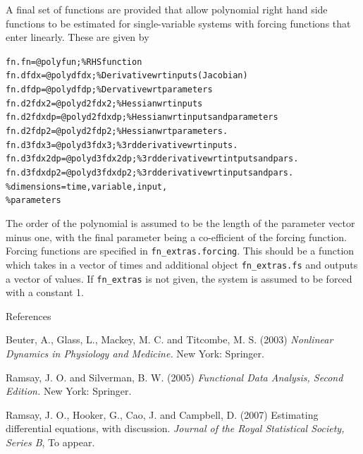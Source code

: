 \documentclass{article}
\begin{document}
A final set of functions are provided that allow polynomial right hand side functions to be
estimated for single-variable systems with forcing functions that enter linearly. These are given
by

\begin{alltt}
   fn.fn       = @polyfun;       \% RHS function
   fn.dfdx     = @polydfdx;      \% Derivative wrt inputs (Jacobian)
   fn.dfdp     = @polydfdp;      \% Dervative wrt parameters
   fn.d2fdx2   = @polyd2fdx2;    \% Hessian wrt inputs
   fn.d2fdxdp  = @polyd2fdxdp;   \% Hessian wrt inputs and parameters
   fn.d2fdp2   = @polyd2fdp2;    \% Hessian wrt parameters.
   fn.d3fdx3   = @polyd3fdx3;    \% 3rd derivative wrt inputs.
   fn.d3fdx2dp = @polyd3fdx2dp;  \% 3rd derivative wrt intputs and pars.
   fn.d3fdxdp2 = @polyd3fdxdp2;  \% 3rd derivative wrt inputs and pars.
                                 \% dimensions = time, variable, input,
                                 \% parameters
\end{alltt}

The order of the polynomial is assumed to be the length of
the parameter vector minus one, with the final parameter
being a co-efficient of the forcing function. Forcing
functions are specified in {\tt fn\_extras.forcing}. This
should be a function which takes in a vector of times and
additional object {\tt fn\_extras.fs} and outputs a
vector of values. If {\tt fn\_extras} is not given, the
system is assumed to be forced with a constant 1.

\newpage

\begin{center}
{\Large References}
\end{center}

\begin{description}

\item Beuter, A., Glass, L., Mackey, M. C. and Titcombe, M. S. (2003) {\em Nonlinear Dynamics in
    Physiology and Medicine.} New York: Springer.

\item Ramsay, J. O. and Silverman, B. W. (2005) {\em Functional Data Analysis, Second Edition.} New
    York: Springer.

\item Ramsay, J. O., Hooker, G., Cao, J. and Campbell, D. (2007) Estimating differential equations,
    with discussion. \emph{Journal of the Royal Statistical Society, Series B}, To appear.

\end{description}
\end{document}
